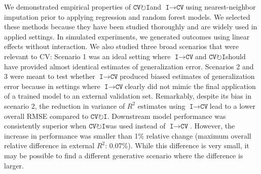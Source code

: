 \documentclass[AMA,STIX1COL,doublespace]{WileyNJD-v2}
\begin{document}
We demonstrated empirical properties of
$\texttt{CV}\!\circlearrowright\!\texttt{I}$\space and
$\texttt{I}\!\!\rightarrow\!\texttt{CV}$\space using nearest-neighbor
imputation prior to applying regression and random forest models. We
selected these methods because they have been studied thoroughly and are
widely used in applied settings. In simulated experiments, we generated
outcomes using linear effects without interaction. We also studied three
broad scenarios that were relevant to CV: Scenario 1 was an ideal
setting where $\texttt{I}\!\!\rightarrow\!\texttt{CV}$\space and
$\texttt{CV}\!\circlearrowright\!\texttt{I}$\space should have provided
almost identical estimates of generalization error. Scenarios 2 and 3
were meant to test whether
$\texttt{I}\!\!\rightarrow\!\texttt{CV}$\space produced biased estimates
of generalization error because in settings where
$\texttt{I}\!\!\rightarrow\!\texttt{CV}$\space clearly did not mimic the
final application of a trained model to an external validation set.
Remarkably, despite its bias in scenario 2, the reduction in variance of
\(R^2\) estimates using
$\texttt{I}\!\!\rightarrow\!\texttt{CV}$\space lead to a lower overall
RMSE compared to $\texttt{CV}\!\circlearrowright\!\texttt{I}$.
Downstream model performance was consistently superior when
$\texttt{CV}\!\circlearrowright\!\texttt{I}$\space was used instead of
$\texttt{I}\!\!\rightarrow\!\texttt{CV}$. However, the increase in
performance was smaller than 1\% relative change (maximum overall
relative difference in external \(R^2\): 0.07\%). While this difference
is very small, it may be possible to find a different generative
scenario where the difference is larger.
\end{document}

